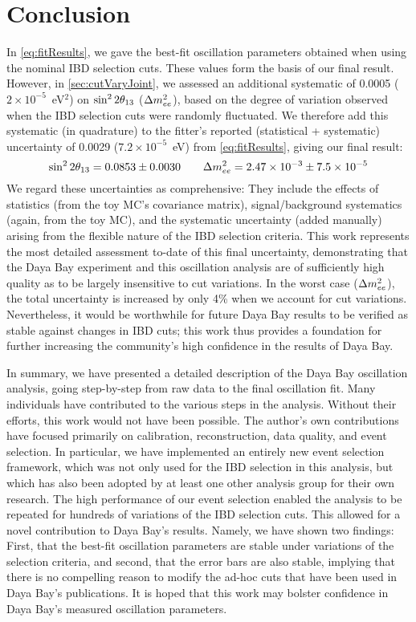 \documentclass[../thesis.tex]{subfiles}
\begin{document}
\chapter{Conclusion}
\label{chap:conclusion}


In \autoref{eq:fitResults}, we gave the best-fit oscillation parameters obtained when using the nominal IBD selection cuts. These values form the basis of our final result. However, in \autoref{sec:cutVaryJoint}, we assessed an additional systematic of 0.0005 ($2\times10^{-5}$~eV$^2$) on $\sin^2 2\theta_{13}$ ($\Delta m^2_{ee}$), based on the degree of variation observed when the IBD selection cuts were randomly fluctuated. We therefore add this systematic (in quadrature) to the fitter's reported (statistical + systematic) uncertainty of 0.0029 ($7.2\times10^{-5}$~eV) from \autoref{eq:fitResults}, giving our final result:
\begin{equation}
  \sin^2 2\theta_{13} = 0.0853 \pm 0.0030 \qquad \Delta m^2_{ee} = 2.47\times10^{-3} \pm 7.5\times10^{-5}
\end{equation}
We regard these uncertainties as comprehensive: They include the effects of statistics (from the toy MC's covariance matrix), signal/background systematics (again, from the toy MC), and the systematic uncertainty (added manually) arising from the flexible nature of the IBD selection criteria. This work represents the most detailed assessment to-date of this final uncertainty, demonstrating that the Daya Bay experiment and this oscillation analysis are of sufficiently high quality as to be largely insensitive to cut variations. In the worst case ($\Delta m^2_{ee}$), the total uncertainty is increased by only 4\% when we account for cut variations. Nevertheless, it would be worthwhile for future Daya Bay results to be verified as stable against changes in IBD cuts; this work thus provides a foundation for further increasing the community's high confidence in the results of Daya Bay.

In summary, we have presented a detailed description of the Daya Bay oscillation analysis, going step-by-step from raw data to the final oscillation fit. Many individuals have contributed to the various steps in the analysis. Without their efforts, this work would not have been possible. The author's own contributions have focused primarily on calibration, reconstruction, data quality, and event selection. In particular, we have implemented an entirely new event selection framework, which was not only used for the IBD selection in this analysis, but which has also been adopted by at least one other analysis group for their own research. The high performance of our event selection enabled the analysis to be repeated for hundreds of variations of the IBD selection cuts. This allowed for a novel contribution to Daya Bay's results. Namely, we have shown two findings: First, that the best-fit oscillation parameters are stable under variations of the selection criteria, and second, that the error bars are also stable, implying that there is no compelling reason to modify the ad-hoc cuts that have been used in Daya Bay's publications. It is hoped that this work may bolster confidence in Daya Bay's measured oscillation parameters.

\end{document}
